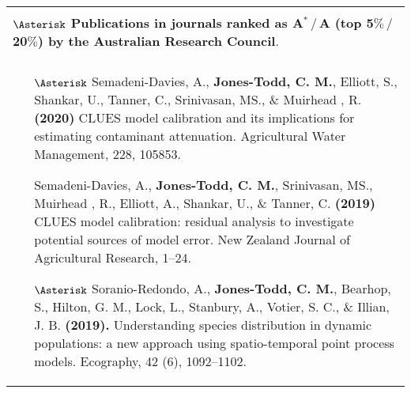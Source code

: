 \documentclass[12pt, a4paper]{article}
\begin{document}
\begin{center}\begin{longtable}{|p{16.3 cm}|}
\hline \cellcolor[gray]{0.8}{\bf 2a.  Research publications and dissemination}  \\
{\bf $\Asterisk$ Publications in journals ranked as A${}^\ast\,/\,$A (top 5$\%\,/\,$20$\%$) by the Australian Research Council}.\\
\hline \cellcolor[gray]{0.8}{Peer reviewed journal articles}  \\
\hline
\begin{itemize}
\item[$\Asterisk$] Semadeni-Davies, A., {\bf Jones-Todd, C. M.},  Elliott, S., Shankar, U., Tanner, C., Srinivasan, MS., \& Muirhead , R. {\bf(2020)} CLUES model calibration and its implications for estimating contaminant attenuation. Agricultural Water Management, 228, 105853.
  \item[] Semadeni-Davies, A., \textbf{Jones-Todd, C. M.}, Srinivasan, MS.,  Muirhead , R.,  Elliott, A., Shankar, U., \& Tanner, C. \textbf{(2019)} CLUES model calibration: residual analysis to investigate potential sources of model error. New Zealand Journal of Agricultural Research, 1--24.
\item[$\Asterisk$] Soranio-Redondo, A., {\bf Jones-Todd, C. M.}, Bearhop, S., Hilton, G. M., Lock, L., Stanbury, A., Votier, S. C., \& Illian, J. B. {\bf (2019).} Understanding species distribution in dynamic populations: a new approach using spatio-temporal point process models. Ecography, 42 (6), 1092--1102.

\end{itemize}
\end{longtable}
\end{center}
\end{document}
